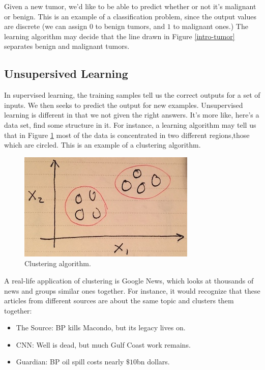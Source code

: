 \documentclass{article}
\theoremstyle{definition}
\begin{document}
Given a new tumor, we'd like to be able to predict whether or not it's malignant or benign. This is an example of a classification problem, since the output values are discrete (we can assign $0$ to benign tumors, and $1$ to malignant ones.) The learning algorithm may decide that the line drawn in Figure \ref{intro-tumor} separates benign and malignant tumors.

\subsection{Unsupersived Learning}
In supervised learning, the training samples tell us the correct outputs for a set of inputs. We then seeks to predict the output for new examples. Unsupervised learning is different in that we not given the right answers. It's more like, here's a data set, find some structure in it. For instance, a learning algorithm may tell us that in Figure \ref{intro-clustering} most of the data is concentrated in two different regions,those which are circled. This is an example of a clustering algorithm.

\begin{figure}[ht]
\centering
\includegraphics[scale=0.8]{images/intro/clustering.jpg}
\caption{Clustering algorithm.}
\label{intro-clustering}
\end{figure}

A real-life application of clustering is Google News, which looks at thousands of news and groups similar ones together. For instance, it would recognize that these articles from different sources are about the same topic and clusters them together:

\begin{itemize}
    \item The Source: BP kills Macondo, but its legacy lives on.
    \item CNN: Well is dead, but much Gulf Coast work remains.
    \item Guardian: BP oil spill costs nearly $\$10$bn dollars.
\end{itemize}
\end{document}
